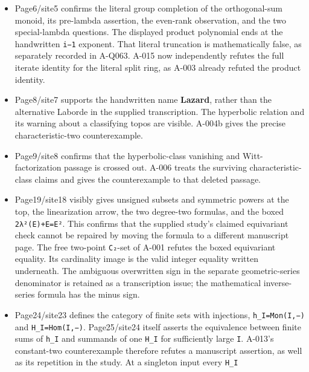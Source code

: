 \documentclass[
  10pt,
]{article}
\providecommand{\tightlist}{%
  \setlength{\itemsep}{0pt}\setlength{\parskip}{0pt}}
\providecommand{\tightlist}{\setlength{\itemsep}{0pt}\setlength{\parskip}{0pt}}
\begin{document}
\begin{itemize}
\tightlist
\item
  Page6/site5 confirms the literal group completion of the
  orthogonal-sum monoid, its pre-lambda assertion, the even-rank
  observation, and the two special-lambda questions. The displayed
  product polynomial ends at the handwritten \texttt{\small i−1}
  exponent. That literal truncation is mathematically false, as
  separately recorded in A-Q063. A-015 now independently refutes the
  full iterate identity for the literal split ring, as A-003 already
  refuted the product identity.
\item
  Page8/site7 supports the handwritten name \textbf{Lazard}, rather than
  the alternative Laborde in the supplied transcription. The hyperbolic
  relation and its warning about a classifying topos are visible. A-004b
  gives the precise characteristic-two counterexample.
\item
  Page9/site8 confirms that the hyperbolic-class vanishing and
  Witt-factorization passage is crossed out. A-006 treats the surviving
  characteristic-class claims and gives the counterexample to that
  deleted passage.
\item
  Page19/site18 visibly gives unsigned subsets and symmetric powers at
  the top, the linearization arrow, the two degree-two formulas, and the
  boxed
  \texttt{\small 2λ²(\allowbreak{}E)\allowbreak{}+\allowbreak{}E=\allowbreak{}E²}.
  This confirms that the supplied study's claimed equivariant check
  cannot be repaired by moving the formula to a different manuscript
  page. The free two-point \texttt{\small C₂}-set of A-001 refutes the
  boxed equivariant equality. Its cardinality image is the valid integer
  equality written underneath. The ambiguous overwritten sign in the
  separate geometric-series denominator is retained as a transcription
  issue; the mathematical inverse-series formula has the minus sign.
\item
  Page24/site23 defines the category of finite sets with injections,
  \texttt{\small h\_\allowbreak{}I=\allowbreak{}Mon(\allowbreak{}I,\allowbreak{}−)\allowbreak{}}
  and
  \texttt{\small H\_\allowbreak{}I=\allowbreak{}Hom(\allowbreak{}I,\allowbreak{}−)\allowbreak{}}.
  Page25/site24 itself asserts the equivalence between finite sums of
  \texttt{\small h\_\allowbreak{}I} and summands of one
  \texttt{\small H\_\allowbreak{}I} for sufficiently large
  \texttt{\small I}. A-013's constant-two counterexample therefore
  refutes a manuscript assertion, as well as its repetition in the
  study. At a singleton input every \texttt{\small H\_\allowbreak{}I}

\end{itemize}
\end{document}
